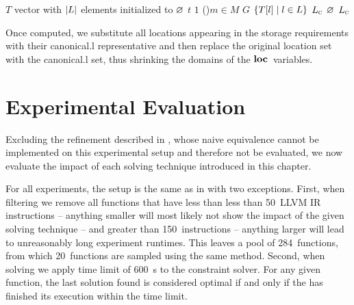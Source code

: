 \begin{algorithm}[t]
  {%
    $T$ \Assign vector with $\mCard{L}$ elements initialized to $\varnothing$\;
    $t$ \Assign $1$\;
    \For(){$m \in M$}{%
    }
    $G$ \Assign $\mSetBuilder{T[l]}{l \in L}$
    $L_{\textrm{\textsc{c}}}$ \Assign $\varnothing$\;
    \Return $L_{\textrm{\textsc{c}}}$\;
  }

  \caption[Algorithm for computing the set of canonical locations]%
          {%
            Computes the canonical locations from a given location set.
            If location restrictions for some data are already enforced by
            the function, then these are also tagged and processed accordingly%
          }
\end{algorithm}

Once computed, we substitute all locations appearing in the storage requirements
with their \gls{canonical.l} representative and then replace the original
\gls{location set} with the \gls{canonical.l} set, thus shrinking the
\glspl{domain} of the $\mVar{loc}$~\glspl{variable}.


\section{Experimental Evaluation}

Excluding the refinement described in , whose naive equivalence cannot be implemented on this
experimental setup and therefore not be evaluated, we now evaluate the impact of
each solving technique introduced in this chapter.

For all experiments, the setup is the same as in
 with two exceptions.
%
First, when filtering we remove all \glspl{function} that have less than less
than \num{50}~\gls{LLVM} \gls{IR} \glspl{instruction} -- anything smaller will
most likely not show the impact of the given solving technique -- and greater
than \num{150}~\glspl{instruction} -- anything larger will lead to unreasonably
long experiment runtimes.
%
This leaves a pool of \num{284}~\glspl{function}, from which
\num{20}~\glspl{function} are sampled using the same method.
%
Second, when solving we apply time limit of \SI{600}{\s} to the \gls{constraint
  solver}.
%
For any given \gls{function}, the last \gls{solution} found is considered
optimal if and only if the  has finished its
execution within the time limit.

